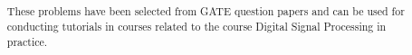 \documentclass[journal,12pt,twocolumn]{IEEEtran}
\begin{document}
\providecommand{\qfunc}[1]{\ensuremath{Q\left(#1\right)}}
\providecommand{\sbrak}[1]{\ensuremath{{}\left[#1\right]}}
\providecommand{\lsbrak}[1]{\ensuremath{{}\left[#1\right.}}
\providecommand{\rsbrak}[1]{\ensuremath{{}\left.#1\right]}}
\providecommand{\brak}[1]{\ensuremath{\left(#1\right)}}
\providecommand{\lbrak}[1]{\ensuremath{\left(#1\right.}}
\providecommand{\rbrak}[1]{\ensuremath{\left.#1\right)}}
\providecommand{\cbrak}[1]{\ensuremath{\left\{#1\right\}}}
\providecommand{\lcbrak}[1]{\ensuremath{\left\{#1\right.}}
\providecommand{\rcbrak}[1]{\ensuremath{\left.#1\right\}}}

\title{
}

\maketitle

\begin{abstract}
These problems have been selected from
GATE question papers and can be used for conducting
tutorials in courses related to the course Digital Signal Processing in practice.
\end{abstract}
\end{document}
